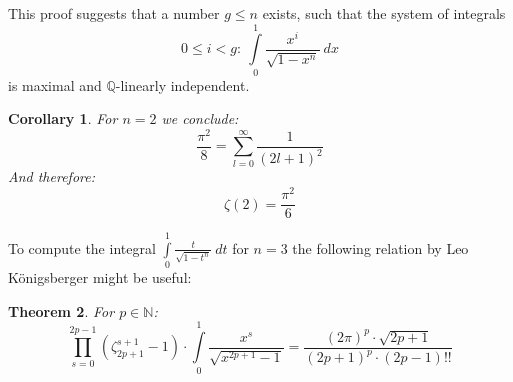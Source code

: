 \documentclass[sn-mathphys]{sn-jnl}%
\theoremstyle{thmstyleone}%
\newtheorem{theorem}{Theorem}%
\newtheorem{corollary}[theorem]{Corollary}
\theoremstyle{thmstyletwo}%
\theoremstyle{thmstylethree}%
\begin{document}
This proof suggests that a number $g \leq n$ exists, such that
the system of integrals
\begin{equation}
0 \leq i < g: \ \int \limits_{0}^{1} \frac{x^i}{\sqrt{1 - x^n}} \ dx
\end{equation}
is maximal and $\mathbb{Q}$-linearly independent.

\begin{corollary}
For $n = 2$ we conclude: \\
\begin{equation}
\frac{\pi^2}{8} = \sum \limits_{l=0}^{\infty} \frac{1}{(2l+1)^2}
\end{equation}
And therefore: \\
\begin{equation}
\zeta(2) = \frac{\pi^2}{6}
\end{equation}
\end{corollary}

To compute the integral $\int \limits_{0}^{1} \frac{t}{\sqrt{1 - t^n}} \ dt$ for $n=3$ the following relation by Leo Königsberger might be useful: \cite{lk}
\begin{theorem}
For $p \in \mathbb{N}$:
\begin{equation}
\prod \limits_{s = 0}^{2p-1} (\zeta_{2p+1}^{s+1} - 1) \cdot \int \limits_{0}^{1} \frac{x^s}{\sqrt{x^{2p+1} - 1}} = \frac{(2 \pi)^p \cdot \sqrt{2p+1}}{(2p+1)^p \cdot (2p-1)!!}
\end{equation}
\end{theorem}
\end{document}
